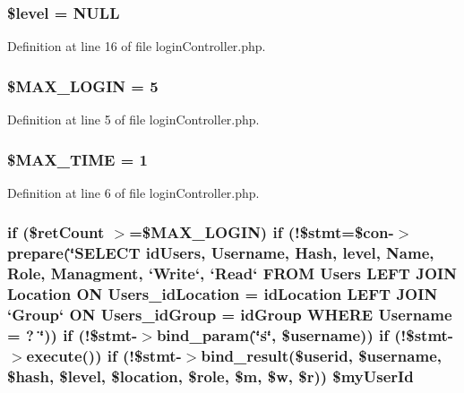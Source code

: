 \subsubsection[{\texorpdfstring{\$level}{$level}}]{\setlength{\rightskip}{0pt plus 5cm}\$level = N\+U\+LL}\hypertarget{login_controller_8php_abd32cc82c6a3f79491987de36ad580ca}{}\label{login_controller_8php_abd32cc82c6a3f79491987de36ad580ca}


Definition at line 16 of file login\+Controller.\+php.

\subsubsection[{\texorpdfstring{\$\+M\+A\+X\+\_\+\+L\+O\+G\+IN}{$MAX_LOGIN}}]{\setlength{\rightskip}{0pt plus 5cm}\$M\+A\+X\+\_\+\+L\+O\+G\+IN = 5}\hypertarget{login_controller_8php_a29df9d9e6f96a4deadc10ccad7ca7b85}{}\label{login_controller_8php_a29df9d9e6f96a4deadc10ccad7ca7b85}


Definition at line 5 of file login\+Controller.\+php.

\subsubsection[{\texorpdfstring{\$\+M\+A\+X\+\_\+\+T\+I\+ME}{$MAX_TIME}}]{\setlength{\rightskip}{0pt plus 5cm}\$M\+A\+X\+\_\+\+T\+I\+ME = 1}\hypertarget{login_controller_8php_af965f1dde416adc9f91471416e63e3fc}{}\label{login_controller_8php_af965f1dde416adc9f91471416e63e3fc}


Definition at line 6 of file login\+Controller.\+php.

\subsubsection[{\texorpdfstring{\$my\+User\+Id}{$myUserId}}]{\setlength{\rightskip}{0pt plus 5cm}if (\$ret\+Count $>$=\$M\+A\+X\+\_\+\+L\+O\+G\+IN) if (!\$stmt=\$con-\/$>$prepare(\char`\"{}S\+E\+L\+E\+CT id\+Users, Username, Hash, level, Name, Role, Managment, `Write`, `Read` F\+R\+OM Users L\+E\+FT J\+O\+IN Location ON Users\+\_\+id\+Location = id\+Location L\+E\+FT J\+O\+IN `Group` ON Users\+\_\+id\+Group = id\+Group W\+H\+E\+RE Username = ? \char`\"{})) if (!\$stmt-\/$>$bind\+\_\+param(\char`\"{}s\char`\"{}, \$username)) if (!\$stmt-\/$>$execute()) if (!\$stmt-\/$>$bind\+\_\+result(\$userid, \$username, \$hash, \$level, \$location, \$role, \$m, \$w, \$r)) \$my\+User\+Id}\hypertarget{login_controller_8php_a67c41f5902e42a545f6ac644c135b3a7}{}\label{login_controller_8php_a67c41f5902e42a545f6ac644c135b3a7}


